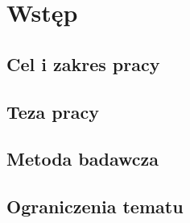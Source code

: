 \chapter{Wstęp} \label{rozdz.wstep} 
\section{Cel i zakres pracy}
\section{Teza pracy}
\section{Metoda badawcza}
\section{Ograniczenia tematu}

